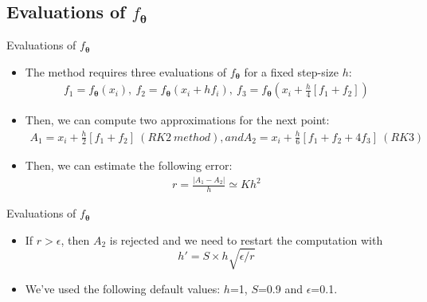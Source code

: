 \documentclass{EESD}
\newcommand{\params}{\ensuremath{\boldsymbol{\theta}}}
\begin{document}
\subsection{Evaluations of $f_{\params}$}
\begin{frame}[t]{Evaluations of $f_{\params}$}
\begin{itemize}
    \item The method requires three evaluations of $f_{\params}$ for a fixed step-size $h$:
    \begin{equation}
        \begin{aligned}
            f_1 = f_{\params}(x_i),\ f_2 = f_{\params}(x_i + hf_i),\ f_3 = f_{\params}(x_i + \frac{h}{4}[f_1 + f_2])
        \end{aligned}
    \end{equation}\pause
    \item Then, we can compute two approximations for the next point:
    \begin{equation}
        \begin{aligned}
            A_1 = x_i + \frac{h}{2}[f_1 +f_2]\ (RK2\ method), and A_2 = x_i + \frac{h}{6}[f_1 + f_2 + 4f_3]\ (RK3)
        \end{aligned}
    \end{equation}\vspace{10pt}\pause
    \item Then, we can estimate the following error:
    \begin{equation}
        \begin{aligned}
            r = \frac{|A_1 - A_2|}{h} \simeq Kh^2
        \end{aligned}
    \end{equation}\vspace{10pt}
\end{itemize}
\end{frame}

\begin{frame}[t]{Evaluations of $f_{\params}$}
\begin{itemize}
    \item If $r>\epsilon$, then $A_2$ is rejected and we need to restart the computation with \begin{equation}
        h'= S \times h\sqrt{\epsilon/r}
    \end{equation}\pause
    \item We've used the following default values: $h$=1, $S$=0.9 and $\epsilon$=0.1.
\end{itemize}
\end{frame}
\end{document}

